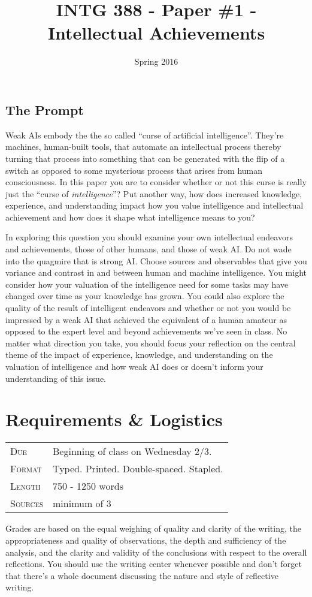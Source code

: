 \documentclass[]{tufte-handout}
\title{INTG 388 - Paper \#1 - Intellectual Achievements}
\date{ Spring 2016 }
\begin{document}
\maketitle
\thispagestyle{empty}


\subsection*{The Prompt}

Weak AIs embody the the so called ``curse of artificial intelligence''.  They're machines, human-built tools, that automate an intellectual process thereby turning that process into something that can be generated with the flip of a switch as opposed to some mysterious process that arises from human consciousness. In this paper you are to consider whether or not this curse is really just the ``curse of \textit{intelligence}''?  Put another way, how does increased knowledge, experience, and understanding impact how you value intelligence and intellectual achievement and how does it shape what intelligence means to you? 

In exploring this question you should examine your own intellectual endeavors and achievements, those of other humans, and those of weak AI. Do not wade into the quagmire that is strong AI. Choose sources and observables that give you variance and contrast in and between human and machine intelligence. You might consider how your valuation of the intelligence need for some tasks may have changed over time as your knowledge has grown. You could also explore the quality of the result of intelligent endeavors and whether or not you would be impressed by a weak AI that achieved the equivalent of a human amateur as opposed to the expert level and beyond achievements we've seen in class.  No matter what direction you take, you should focus your reflection on the central theme of the impact of experience, knowledge, and understanding on the valuation of intelligence and how weak AI does or doesn't inform your understanding of this issue. 

\section{Requirements \& Logistics}

\begin{tabular}{ll}
\textsc{Due} & Beginning of class on Wednesday 2/3. \\
\textsc{Format} & Typed. Printed. Double-spaced. Stapled. \\
\textsc{Length} & 750 - 1250 words \\
\textsc{Sources} & minimum of 3 \\
\end{tabular}

Grades are based on the equal weighing of quality and clarity of the writing, the appropriateness and quality of observations, the depth and sufficiency of the analysis, and the clarity and validity of the conclusions with respect to the overall reflections.  You should use the writing center whenever possible and don't forget that there's a whole document discussing the nature and style of reflective writing.
\end{document}
